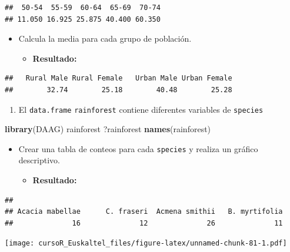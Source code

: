 \documentclass[]{book}
\newenvironment{Shaded}{\begin{snugshade}}{\end{snugshade}}
\newcommand{\KeywordTok}[1]{\textcolor[rgb]{0.13,0.29,0.53}{\textbf{#1}}}
\newcommand{\NormalTok}[1]{#1}
\providecommand{\tightlist}{%
  \setlength{\itemsep}{0pt}\setlength{\parskip}{0pt}}
\begin{document}
\begin{verbatim}
##  50-54  55-59  60-64  65-69  70-74 
## 11.050 16.925 25.875 40.400 60.350
\end{verbatim}

\begin{itemize}
\item
  Calcula la media para cada grupo de población.

  \begin{itemize}
  \tightlist
  \item
    \textbf{Resultado:}
  \end{itemize}
\end{itemize}

\begin{verbatim}
##   Rural Male Rural Female   Urban Male Urban Female 
##        32.74        25.18        40.48        25.28
\end{verbatim}

\begin{enumerate}
\def\labelenumi{\arabic{enumi}.}
\setcounter{enumi}{1}
\tightlist
\item
  El \texttt{data.frame} \texttt{rainforest} contiene diferentes
  variables de \texttt{species}
\end{enumerate}

\begin{Shaded}
\begin{Highlighting}[]
\KeywordTok{library}\NormalTok{(DAAG)}
\NormalTok{rainforest}
\NormalTok{?rainforest}
\KeywordTok{names}\NormalTok{(rainforest)}
\end{Highlighting}
\end{Shaded}

\begin{itemize}
\item
  Crear una tabla de conteos para cada \texttt{species} y realiza un
  gráfico descriptivo.

  \begin{itemize}
  \tightlist
  \item
    \textbf{Resultado:}
  \end{itemize}
\end{itemize}

\begin{verbatim}
## 
## Acacia mabellae      C. fraseri  Acmena smithii   B. myrtifolia 
##              16              12              26              11
\end{verbatim}

\texttt{[image: cursoR\_Euskaltel\_files/figure-latex/unnamed-chunk-81-1.pdf]}
\end{document}
